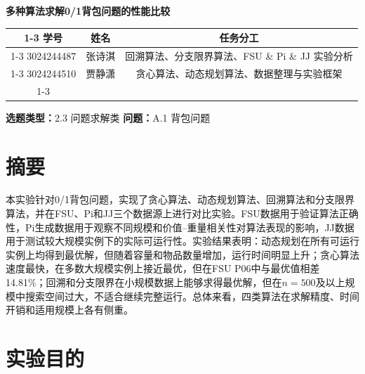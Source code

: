 \documentclass[10.5pt,a4paper,fontset=none]{ctexart}
\begin{document}


\vspace*{0.8cm}

\begin{center}
  {\Large \textbf{多种算法求解0/1背包问题的性能比较}}
\end{center}

\vspace{0.5cm}

\begin{center}
\begin{tabular}{ccc}
\cline{1-3}
学号 & 姓名 & 任务分工 \\
\cline{1-3}
3024244487 & 张诗淇 & 回溯算法、分支限界算法、FSU \& Pi \& JJ 实验分析 \\
\cline{1-3}
3024244510 & 贾静潇 & 贪心算法、动态规划算法、数据整理与实验框架 \\
\cline{1-3}
\end{tabular}
\end{center}

\vspace{0.3cm}

\begin{center}
  \textbf{选题类型：}2.3 问题求解类 \quad \textbf{问题：}A.1 背包问题
\end{center}

\vspace{0.5cm}


\section{摘要}

本实验针对0/1背包问题，实现了贪心算法、动态规划算法、回溯算法和分支限界算法，并在FSU、Pi和JJ三个数据源上进行对比实验。FSU数据用于验证算法正确性，Pi生成数据用于观察不同规模和价值--重量相关性对算法表现的影响，JJ数据用于测试较大规模实例下的实际可运行性。实验结果表明：动态规划在所有可运行实例上均得到最优解，但随着容量和物品数量增加，运行时间明显上升；贪心算法速度最快，在多数大规模实例上接近最优，但在FSU P06中与最优值相差14.81\%；回溯和分支限界在小规模数据上能够求得最优解，但在$n=500$及以上规模中搜索空间过大，不适合继续完整运行。总体来看，四类算法在求解精度、时间开销和适用规模上各有侧重。


\section{实验目的}
\end{document}
